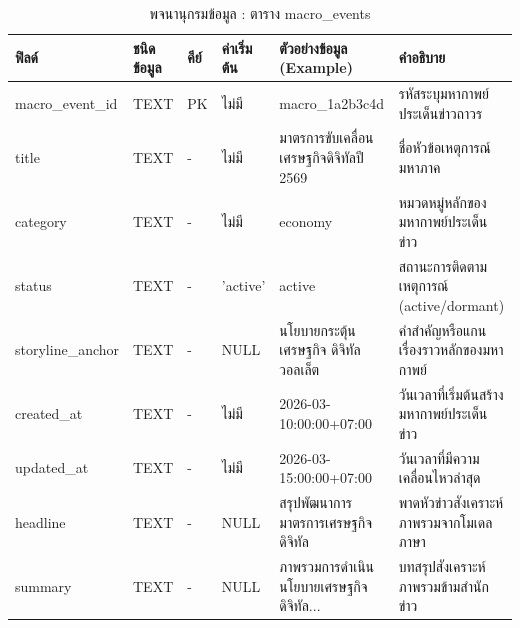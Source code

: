 \begin{table}[H]
\centering
\caption{พจนานุกรมข้อมูล : ตาราง macro\_\allowbreak events}
\label{tab_schema_macro_events}
\begin{tabularx}{\textwidth}{|L{2.5cm}|C{1.6cm}|C{0.8cm}|C{1.6cm}|L{3.1cm}|Y|}
\hline
\textbf{ฟิลด์} & \textbf{ชนิดข้อมูล} & \textbf{คีย์} & \textbf{ค่าเริ่มต้น} & \textbf{ตัวอย่างข้อมูล (Example)} & \textbf{คำอธิบาย} \\
\hline
macro\_\allowbreak event\_\allowbreak id & TEXT & PK & ไม่มี & macro\_\allowbreak 1a2b3c4d & รหัสระบุมหากาพย์ประเด็นข่าวถาวร \\ \hline
title & TEXT & - & ไม่มี & มาตรการขับเคลื่อน\newline เศรษฐกิจดิจิทัลปี 2569 & ชื่อหัวข้อเหตุการณ์มหาภาค \\ \hline
category & TEXT & - & ไม่มี & economy & หมวดหมู่หลักของมหากาพย์ประเด็นข่าว \\ \hline
status & TEXT & - & 'active' & active & สถานะการติดตามเหตุการณ์ (active/dormant) \\ \hline
storyline\_\allowbreak anchor & TEXT & - & NULL & นโยบายกระตุ้นเศรษฐกิจ ดิจิทัลวอลเล็ต & คำสำคัญหรือแกนเรื่องราวหลักของมหากาพย์ \\ \hline
created\_\allowbreak at & TEXT & - & ไม่มี & 2026-03-10:00:00+07:00 & วันเวลาที่เริ่มต้นสร้างมหากาพย์ประเด็นข่าว \\ \hline
updated\_\allowbreak at & TEXT & - & ไม่มี & 2026-03-15:00:00+07:00 & วันเวลาที่มีความเคลื่อนไหวล่าสุด \\ \hline
headline & TEXT & - & NULL & สรุปพัฒนาการมาตรการเศรษฐกิจดิจิทัล & พาดหัวข่าวสังเคราะห์ภาพรวมจากโมเดลภาษา \\ \hline
summary & TEXT & - & NULL & ภาพรวมการดำเนินนโยบายเศรษฐกิจดิจิทัล... & บทสรุปสังเคราะห์ภาพรวมข้ามสำนักข่าว \\
\hline
\end{tabularx}
\end{table}


